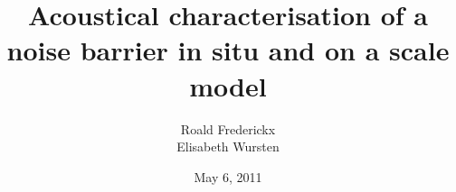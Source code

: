 \documentclass[11pt,a4paper]{article}
\author{Roald Frederickx\\Elisabeth Wursten}
\title{Acoustical characterisation of a noise barrier in situ and on a 
scale model}
\date{May 6, 2011}
\begin{document}
\maketitle











\clearpage
\footnotesize


\nocite{*}
\end{document}
